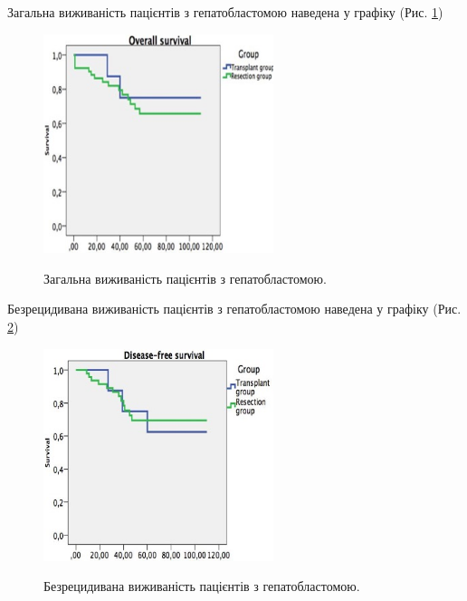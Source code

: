 Загальна виживаність пацієнтів з гепатобластомою наведена у графіку (Рис. \ref{fig:os})
\begin{figure}[h]
\caption{Загальна виживаність пацієнтів з гепатобластомою.}
\centering
\includegraphics[width=0.6\textwidth]{Illustrations/os.jpg}
\label{fig:os} 
\end{figure}

Безрецидивана виживаність пацієнтів з гепатобластомою наведена у графіку (Рис. \ref{fig:dfs})

\begin{figure}[h]
\caption{Безрецидивана виживаність пацієнтів з гепатобластомою.}
\centering
\includegraphics[width=0.6\textwidth]{Illustrations/dfs.jpg}
\label{fig:dfs} 
\end{figure}




